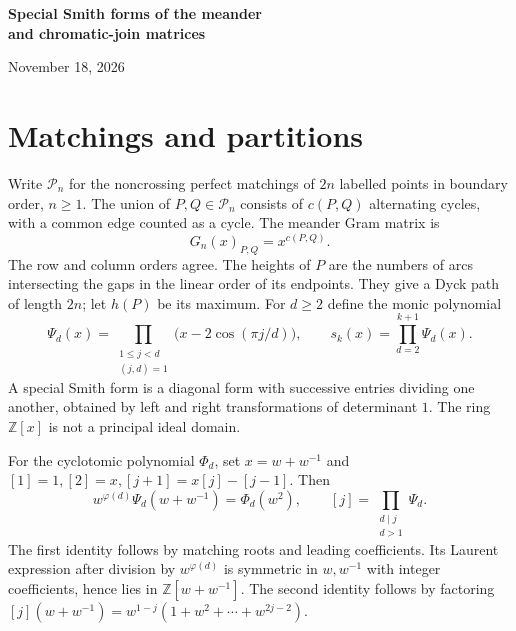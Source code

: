 \documentclass[11pt]{article}
\newcommand{\ZZ}{\mathbb Z}
\newcommand{\nc}{\mathcal P_n}
\begin{document}
\begin{center}
{\LARGE\bfseries Special Smith forms of the meander\\[.16em] and chromatic-join matrices\par}
\vspace{.7em}{\large Iaroslav Argunov\par}
\vspace{.2em}November 18, 2026
\end{center}
\begin{abstract}
We construct a special Smith form over \(\mathbb Z[X,Y]\) for the
two-variable chromatic-join matrix of noncrossing partitions, settling
the first conjecture of Miller and Stanton. Their second conjecture,
for the meander Gram matrix over \(\mathbb Z[x]\), follows by their
equal-parameter specialization. A finite B\'ezout identity combines
integral multiples of two-coloured Jones--Wenzl projectors and produces
a unitriangular operation on rows of each Dyck height. The right multiplier has
an entry formula in terms of two block counts and a prefix of arcs in distinct cycles.
A reflection
count accounts for the full determinant degree and makes the quotient
unimodular. The connected matrix has integer Smith factors determined
by the maximum heights of the paths.
\end{abstract}
\section{Matchings and partitions}

Write \(\nc\) for the noncrossing perfect matchings of \(2n\) labelled
points in boundary order, \(n\ge1\). The union of \(P,Q\in\nc\)
consists of \(c(P,Q)\) alternating cycles, with a common edge counted
as a cycle. The meander Gram matrix is
\[
                 G_n(x)_{P,Q}=x^{c(P,Q)} .
\]
The row and column orders agree. The heights of \(P\) are the numbers
of arcs intersecting the gaps in the linear order of its endpoints.
They give a Dyck path of length \(2n\); let \(h(P)\) be its maximum.
For \(d\ge2\) define the monic polynomial
\[
 \Psi_d(x)=\prod_{\substack{1\le j<d\\(j,d)=1}}
                  \bigl(x-2\cos(\pi j/d)\bigr),\qquad
 s_k(x)=\prod_{d=2}^{k+1}\Psi_d(x).
\]
A special Smith form is a diagonal form with successive entries
dividing one another, obtained by left and right transformations of
determinant \(1\). The ring \(\ZZ[x]\) is not a principal ideal domain.


For the cyclotomic polynomial \(\Phi_d\), set \(x=w+w^{-1}\) and \([1]=1,[2]=x,[j+1]=x[j]-[j-1]\). Then
\begin{equation}
 w^{\varphi(d)}\Psi_d(w+w^{-1})=\Phi_d(w^2),\qquad
 [j]=\prod_{\substack{d\mid j\\d>1}}\Psi_d . \label{cyc}
\end{equation}
The first identity follows by matching roots and leading coefficients.
Its Laurent expression after division by \(w^{\varphi(d)}\) is symmetric
in \(w,w^{-1}\) with integer coefficients, hence lies in \(\ZZ[w+w^{-1}]\).
The second identity follows by factoring
\([j](w+w^{-1})=w^{1-j}(1+w^2+\cdots+w^{2j-2})\).
\end{document}
